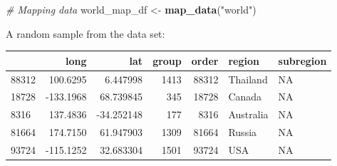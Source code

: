 \documentclass[]{book}
\newenvironment{Shaded}{\begin{snugshade}}{\end{snugshade}}
\newcommand{\KeywordTok}[1]{\textcolor[rgb]{0.13,0.29,0.53}{\textbf{#1}}}
\newcommand{\StringTok}[1]{\textcolor[rgb]{0.31,0.60,0.02}{#1}}
\newcommand{\CommentTok}[1]{\textcolor[rgb]{0.56,0.35,0.01}{\textit{#1}}}
\newcommand{\NormalTok}[1]{#1}
\theoremstyle{definition}
\theoremstyle{definition}
\theoremstyle{definition}
\theoremstyle{remark}
\begin{document}
\begin{Shaded}
\begin{Highlighting}[]
\CommentTok{# Mapping data}
\NormalTok{world_map_df <-}\StringTok{ }\KeywordTok{map_data}\NormalTok{(}\StringTok{"world"}\NormalTok{)}
\end{Highlighting}
\end{Shaded}

A random sample from the data set:

\begin{tabular}{l|r|r|r|r|l|l}
\hline
  & long & lat & group & order & region & subregion\\
\hline
88312 & 100.6295 & 6.447998 & 1413 & 88312 & Thailand & NA\\
\hline
18728 & -133.1968 & 68.739845 & 345 & 18728 & Canada & NA\\
\hline
8316 & 137.4836 & -34.252148 & 177 & 8316 & Australia & NA\\
\hline
81664 & 174.7150 & 61.947903 & 1309 & 81664 & Russia & NA\\
\hline
93724 & -115.1252 & 32.683304 & 1501 & 93724 & USA & NA\\
\hline
\end{tabular}
\end{document}
